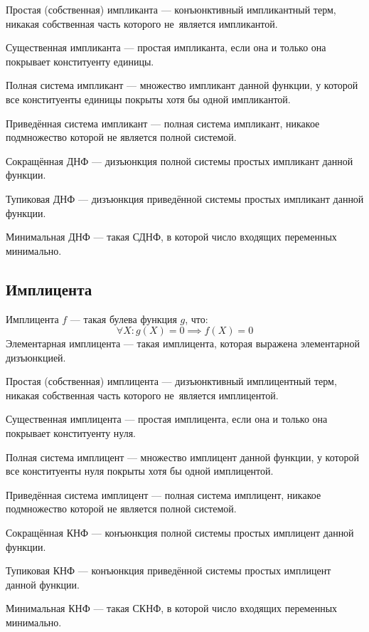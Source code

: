 {\bold Простая {\ital (собственная)} импликанта} --- конъюнктивный импликантный терм, никакая собственная часть которого не~является импликантой.

{\bold Существенная импликанта} --- простая импликанта, если она и только она покрывает конституенту единицы. 

{\bold Полная система импликант} --- множество импликант данной функции, у которой все конституенты единицы покрыты хотя бы одной импликантой.

{\bold Приведённая система импликант} --- полная система импликант, никакое подмножество которой не является полной системой. 

{\bold Сокращённая ДНФ} --- дизъюнкция полной системы простых импликант данной функции.

{\bold Тупиковая ДНФ} --- дизъюнкция приведённой системы простых импликант данной функции.

{\bold Минимальная ДНФ} --- такая СДНФ, в которой число входящих переменных минимально.

\subsection{Имплицента}

{\bold Имплицента} $f$ --- такая булева функция $g$, что:
$$\forall X\colon g(X)=0\implies f(X)=0$$
{\bold Элементарная имплицента} --- такая имплицента, которая выражена элементарной дизъюнкцией.

{\bold Простая {\ital (собственная)} имплицента} --- дизъюнктивный имплицентный терм, никакая собственная часть которого не~является имплицентой.

{\bold Существенная имплицента} --- простая имплицента, если она и только она покрывает конституенту нуля. 

{\bold Полная система имплицент} --- множество имплицент данной функции, у которой все конституенты нуля покрыты хотя бы одной имплицентой.

{\bold Приведённая система имплицент} --- полная система имплицент, никакое подмножество которой не является полной системой. 

{\bold Сокращённая КНФ} --- конъюнкция полной системы простых имплицент данной функции.

{\bold Тупиковая КНФ} --- конъюнкция приведённой системы простых имплицент данной функции.

{\bold Минимальная КНФ} --- такая СКНФ, в которой число входящих переменных минимально.

